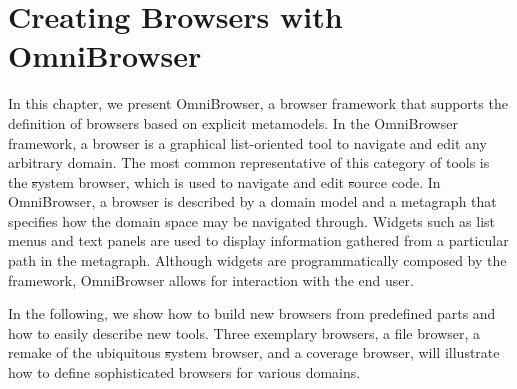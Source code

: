 \documentclass[a4paper,10pt,twoside]{book}
\begin{document}
	\sloppy
\fi

\newcommand{\ob}{OmniBrowser\xspace}
\newcommand{\obf}{OmniBrowser framework\xspace}
\newcommand{\applflab}{ApplFLab\xspace}



\chapter{Creating Browsers with OmniBrowser}


\noindent
In this chapter, we present \ob, a browser framework that supports the definition of browsers based on explicit metamodels. In the \obf, a browser is a graphical list-oriented tool to navigate and edit any arbitrary domain. The most common representative of this category of tools is the \st system browser, which is used to navigate and edit \st source code.
In \ob, a browser is described by a domain model and a metagraph that specifies how the domain space may be navigated through. Widgets such as list menus and text panels are used to display information gathered from a particular path in the metagraph. Although widgets are programmatically composed by the framework, \ob allows for interaction with the end user.

In the following, we show how to build new browsers from predefined parts and how to easily describe new tools. Three exemplary browsers, a file browser, a remake of the ubiquitous \st system browser, and a coverage browser, will illustrate how to define sophisticated browsers for various domains.

\end{document}
